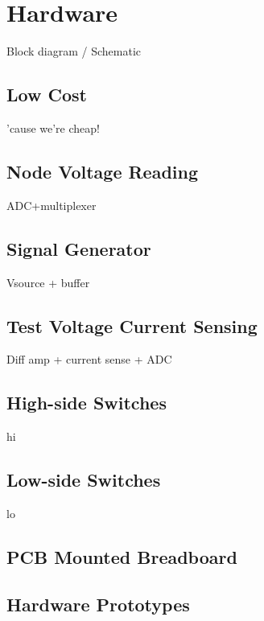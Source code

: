 \chapter{Hardware}
Block diagram / Schematic

\section{Low Cost}

'cause we're cheap!

\section{Node Voltage Reading}
ADC+multiplexer

\section{Signal Generator}
Vsource + buffer

\section{Test Voltage Current Sensing}
Diff amp + current sense + ADC

\section{High-side Switches}
hi
\section{Low-side Switches}
lo

\section{PCB Mounted Breadboard}

\section{Hardware Prototypes}
